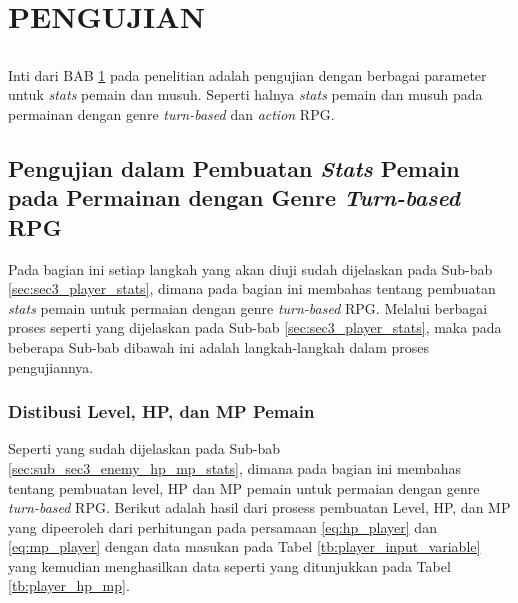 \chapter{PENGUJIAN}
\label{chap:chap4_pengujian}
\vspace{1ex}

\section*{}
Inti dari BAB \ref{chap:chap4_pengujian} pada penelitian adalah pengujian dengan berbagai parameter untuk \textit{stats} pemain dan musuh. Seperti halnya \textit{stats} pemain dan musuh pada permainan dengan genre \textit{turn-based} dan \textit{action} RPG.
\vspace{1ex}

\section{Pengujian dalam Pembuatan \textit{Stats} Pemain pada Permainan dengan Genre \textit{Turn-based} RPG}
\label{sec:sec4_pengujian_turn-based_player}
\vspace{1ex}

Pada bagian ini setiap langkah yang akan diuji sudah dijelaskan pada Sub-bab \ref{sec:sec3_player_stats}, dimana pada bagian ini membahas tentang pembuatan \textit{stats} pemain untuk permaian dengan genre \textit{turn-based} RPG. Melalui berbagai proses seperti yang dijelaskan pada Sub-bab \ref{sec:sec3_player_stats}, maka pada beberapa Sub-bab dibawah ini adalah langkah-langkah dalam proses pengujiannya.
\vspace{1ex}

\subsection{Distibusi Level, HP, dan MP Pemain}
\label{sec:sub_sec4_eval_dist_hp_mp_level}
\vspace{1ex}

Seperti yang sudah dijelaskan pada Sub-bab \ref{sec:sub_sec3_enemy_hp_mp_stats}, dimana pada bagian ini membahas tentang pembuatan level, HP dan MP pemain untuk permaian dengan genre \textit{turn-based} RPG. Berikut adalah hasil dari prosess pembuatan Level, HP, dan MP yang dipeeroleh dari perhitungan pada persamaan \ref{eq:hp_player} dan \ref{eq:mp_player} dengan data masukan pada Tabel \ref{tb:player_input_variable} yang kemudian menghasilkan data seperti yang ditunjukkan pada Tabel \ref{tb:player_hp_mp}. 

